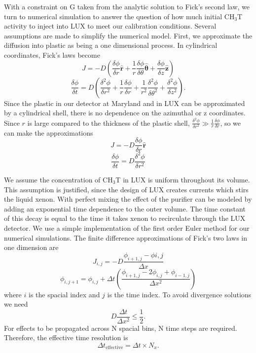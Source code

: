 \documentclass[a4paper,12pt]{article}
\begin{document}
{With a constraint on G taken from the analytic solution to Fick's second law, we turn to numerical simulation to answer
the question of how much initial CH$_3$T activity to inject into LUX to meet our calibration conditions. Several assumptions are made to simplify the numerical model. First, we approximate the diffusion into plastic as being a one dimensional process. In cylindrical coordinates, Fick's laws become
\begin{equation}
J = -D \left( \frac{\delta \phi}{\delta r} \mathbf{\hat{r}} + \frac{1}{r} \frac{\delta \phi}{\delta \theta} \boldsymbol{\hat{\theta}} + \frac{\delta \phi}{\delta z} \mathbf{\hat{z}} \right) 
\end{equation}
\begin{equation}
\frac{\delta \phi}{\delta t} = D \left( \frac{\delta^2 \phi}{\delta r^2} + \frac{1}{r}\frac{\delta \phi}{\delta r} + \frac{1}{r^2} \frac{\delta^2 \phi}{\delta \theta^2} + \frac{\delta^2 \phi}{\delta z^2} \right).
\end{equation}
Since the plastic in our detector at Maryland and in LUX can be approximated by a cylindrical shell, there is no dependence on the azimuthal or z coordinates. Since $r$ is large compared to the thickness of the plastic shell, $\frac{\delta^2 \phi}{\delta r^2} \gg \frac{1}{r}\frac{\delta \phi}{\delta r}$, so we can make the approximations
\begin{equation}
J=-D\frac{\delta \phi}{\delta r} \mathbf{\hat{r}}
\end{equation}
\begin{equation}
\frac{\delta \phi}{\delta t} = D \frac{\delta^2 \phi}{\delta r^2}
\end{equation}

We assume the concentration of CH$_3$T in LUX is uniform throughout its volume. This assumption is justified, since the design of LUX creates currents which stirs the liquid xenon. With perfect mixing the effect of the purifier can be modeled by adding an exponential time dependence to the outer volume. The time constant of this decay is equal to the time it takes xenon to recirculate through the LUX detector. We use a simple implementation of the first order Euler method for our numerical simulations. The finite difference approximations of Fick's two laws in one dimension are
\begin{equation}
J_{i,j}=-D \frac{ \phi_{i+1,j} - \phi{i,j}}{\Delta x}
\end{equation}
\begin{equation}
\phi_{i,j+1}=\phi_{i,j}+ \Delta t \left( \frac{\phi_{i+1,j}-2\phi_{i,j}+\phi_{i-1,j}}{\Delta x^2}\right)
\end{equation}
where $i$ is the spacial index and $j$ is the time index.  To avoid divergence solutions we need
\begin{equation}
D\frac{\Delta t}{\Delta x^2} \le \frac{1}{2}.
\end{equation}
For effects to be propagated across N spacial bins, N time steps are required.
Therefore, the effective time resolution is
\begin{equation}
\Delta t_{\text{effective}}=\Delta t \times N_x.
\end{equation}

}
\end{document}
